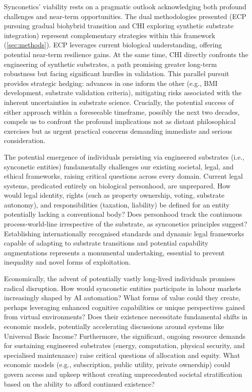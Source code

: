 \documentclass[10pt]{article}
\begin{document}
\begin{sloppypar}
  Synconetics’ viability rests on a pragmatic outlook acknowledging both profound challenges and near-term opportunities. The dual methodologies presented (ECP pursuing gradual biohybrid transition and CHI exploring synthetic substrate integration) represent complementary strategies within this framework (\autoref{sec:methods}). ECP leverages current biological understanding, offering potential near-term resilience gains. At the same time, CHI directly confronts the engineering of synthetic substrates, a path promising greater long-term robustness but facing significant hurdles in validation. This parallel pursuit provides strategic hedging: advances in one inform the other (e.g., BMI development, substrate validation criteria), mitigating risks associated with the inherent uncertainties in substrate science. Crucially, the potential success of either approach within a foreseeable timeframe, possibly the next two decades, compels us to confront the profound implications not as distant philosophical exercises but as urgent practical concerns demanding immediate and serious consideration.

  The potential emergence of individuals persisting via engineered substrates (i.e., synconetic entities) fundamentally challenges our existing societal, legal, and ethical frameworks, raising critical questions across every domain. Current legal systems, predicated entirely on biological personhood, are unprepared. How would legal identity, rights (such as property ownership, voting, substrate autonomy), and responsibilities (taxation, liability) be defined for an entity potentially lacking a conventional body? Does personhood track the continuous process-world-line irrespective of the substrate, as synconetics principles suggest? Establishing internationally recognised standards and dynamic legal frameworks capable of adapting to substrate transitions and potential capability augmentations represents a monumental undertaking, essential to prevent inequality and novel forms of exploitation.

  Economically, the advent of potentially vastly long-lived individuals promises radical disruption. How would synconetic entities participate in labour markets increasingly shaped by AI automation? What forms of value could they create, perhaps leveraging enhanced cognitive capabilities or unique perspectives gained from virtual environments? Does their existence necessitate fundamental shifts in economic models, potentially accelerating discussions around systems like Universal Basic Income? Furthermore, the significant, ongoing resource demands for sustaining engineered substrates (energy, computation, physical security, and specialised maintenance) raise critical questions of allocation and equity. What economic models (e.g., subscription, public utility, private ownership) could govern access and upkeep without creating unprecedented societal stratification based on the ability to afford continued existence?


\end{sloppypar}
\end{document}

